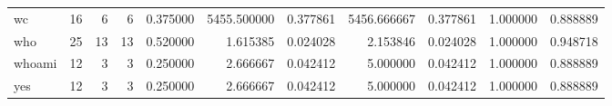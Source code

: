 \begin{tabular}{lrrrrrrrrrr}
wc        &                                      16 &                  6 &                                 6 &                                   0.375000 &                            5455.500000 &                                     0.377861 &                       5456.666667 &                                0.377861 &                           1.000000 &                                           0.888889 \\
who       &                                      25 &                 13 &                                13 &                                   0.520000 &                               1.615385 &                                     0.024028 &                          2.153846 &                                0.024028 &                           1.000000 &                                           0.948718 \\
whoami    &                                      12 &                  3 &                                 3 &                                   0.250000 &                               2.666667 &                                     0.042412 &                          5.000000 &                                0.042412 &                           1.000000 &                                           0.888889 \\
yes       &                                      12 &                  3 &                                 3 &                                   0.250000 &                               2.666667 &                                     0.042412 &                          5.000000 &                                0.042412 &                           1.000000 &                                           0.888889 \\
\bottomrule
\end{tabular}

